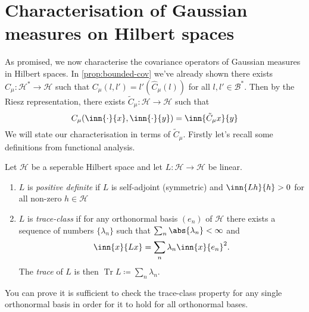 \documentclass[fontsize=12pt, DIV=10]{scrreprt}
\theoremstyle{remark}
\newcommand{\defeq}{\coloneqq}
\newcommand{\calB}{\mathcal B}
\newcommand{\calH}{\mathcal H}
\DeclareMathOperator{\tr}{Tr}
\begin{document}
\section{Characterisation of Gaussian measures on Hilbert spaces}

As promised, we now characterise the covariance operators of Gaussian measures in Hilbert spaces. In \vref{prop:bounded-cov} we've already shown there exists $\hat{C}_{\mu}: \calH^* \to \calH$ such that $C_{\mu}(l, l') = l'(\hat{C}_{\mu}(l))$ for all $l, l' \in \calB^*$. Then by the Riesz representation, there exists $\tilde{C}_{\mu}: \calH \to \calH$ such that
\begin{equation}
	C_{\mu}(\inn{\cdot}{x}, \inn{\cdot}{y}) = \inn{\tilde{C}_{\mu}x}{y}
\end{equation}
We will state our characterisation in terms of $\tilde{C}_{\mu}$. Firstly let's recall some definitions from functional analysis.
\begin{defn}
	Let $\calH$ be a seperable Hilbert space and let $L: \calH \to \calH$ be linear.
	\begin{enumerate}
		\item $L$ is \emph{positive definite} if $L$ is self-adjoint (symmetric) and $\inn{L h}{h} > 0$ for all non-zero $h \in \calH$
		\item $L$ is \emph{trace-class} if for any orthonormal basis $(e_n)$ of $\calH$ there exists a sequence of numbers $\{\lambda_n\}$ such that $\sum_n \abs{\lambda_n} < \infty$ and
			\begin{equation}
				\inn{x}{Lx} = \sum_n \lambda_n \inn{x}{e_n}^2.
			\end{equation}
			The \emph{trace} of $L$ is then $\tr L \defeq \sum_n \lambda _n$.
	\end{enumerate}
\end{defn}
You can prove it is sufficient to check the trace-class property for any single orthonormal basis in order for it to hold for all orthonormal bases.
\end{document}
